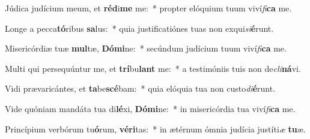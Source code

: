 \item Júdica judícium meum, et \textbf{réd}i\textbf{me} me:~* propter elóquium tuum viví\textit{fi}\textbf{ca} me.
\item Longe a pecca\textbf{tó}ribus \textbf{sa}lus:~* quia justificatiónes tuas non exqui\textit{si}\textbf{é}runt.
\item Misericórdiæ tuæ \textbf{mul}tæ, \textbf{Dó}\textbf{mi}ne:~* secúndum judícium tuum viví\textit{fi}\textbf{ca} me.
\item Multi qui persequúntur me, et \textbf{trí}bu\textbf{lant} me:~* a testimóniis tuis non de\textit{cli}\textbf{ná}vi.
\item Vidi prævaricántes, et \textbf{ta}be\textbf{scé}bam:~* quia elóquia tua non custo\textit{di}\textbf{é}runt.
\item Vide quóniam mandáta tua di\textbf{lé}xi, \textbf{Dó}\textbf{mi}ne:~* in misericórdia tua viví\textit{fi}\textbf{ca} me.
\item Princípium verbórum tu\textbf{ó}rum, \textbf{vé}\textbf{ri}tas:~* in ætérnum ómnia judícia justíti\textit{æ} \textbf{tu}æ.
